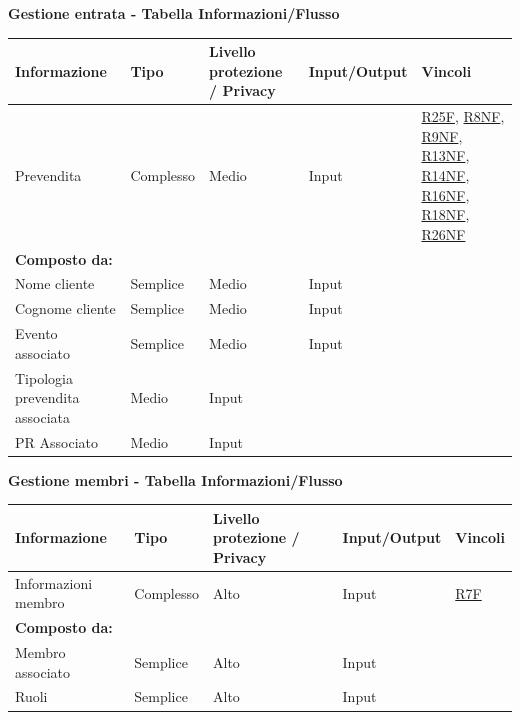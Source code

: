 \documentclass[a4paper]{article}
\begin{document}
\newpage

\textbf{Gestione entrata  - Tabella Informazioni/Flusso}

\begin{center}
    \begin{tabularx}{1\textwidth}{|X|X|X|X|X|}
        \hline
        \textbf{Informazione} &\textbf{Tipo} & \textbf{Livello protezione / Privacy} & \textbf{Input/Output} & \textbf{Vincoli}\\
        \hline
        \hline
        Prevendita & Complesso & Medio & Input & \hyperlink{R25F}{R25F}, \hyperlink{R8NF}{R8NF}, \hyperlink{R9NF}{R9NF}, \hyperlink{R13NF}{R13NF}, \hyperlink{R14NF}{R14NF}, \hyperlink{R16NF}{R16NF}, \hyperlink{R18NF}{R18NF}, \hyperlink{R26NF}{R26NF} \\
        \textbf{Composto da:} & & & & \\
        Nome cliente & Semplice & Medio & Input & \\
        Cognome cliente & Semplice & Medio & Input & \\
        Evento associato & Semplice & Medio & Input & \\
        Tipologia prevendita associata & Medio & Input & \\
        PR Associato & Medio & Input & \\
        \hline
    \end{tabularx}
\end{center}


\textbf{Gestione membri  - Tabella Informazioni/Flusso}

\begin{center}
    \begin{tabularx}{1\textwidth}{|X|X|X|X|X|}
        \hline
        \textbf{Informazione} &\textbf{Tipo} & \textbf{Livello protezione / Privacy} & \textbf{Input/Output} & \textbf{Vincoli}\\
        \hline
        \hline
        Informazioni membro & Complesso & Alto & Input & \hyperlink{R7F}{R7F}\\
        \textbf{Composto da:} & & & & \\
        Membro associato & Semplice & Alto & Input & \\
        Ruoli & Semplice & Alto & Input & \\
        \hline
    \end{tabularx}
\end{center}
\end{document}
